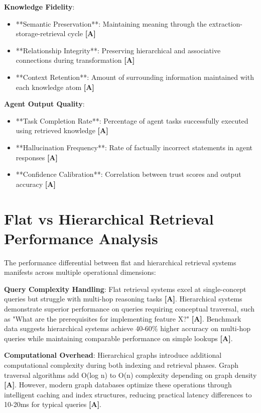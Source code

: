 \documentclass[a4paper,11pt]{article}
\newcommand{\alabel}{\textbf{\textcolor{acolor}{[A]}}}
\begin{document}
\textbf{Knowledge Fidelity}:

\begin{itemize}
  \item **Semantic Preservation**: Maintaining meaning through the extraction-storage-retrieval cycle \alabel{}
  \item **Relationship Integrity**: Preserving hierarchical and associative connections during transformation \alabel{}
  \item **Context Retention**: Amount of surrounding information maintained with each knowledge atom \alabel{}
\end{itemize}

\textbf{Agent Output Quality}:

\begin{itemize}
  \item **Task Completion Rate**: Percentage of agent tasks successfully executed using retrieved knowledge \alabel{}
  \item **Hallucination Frequency**: Rate of factually incorrect statements in agent responses \alabel{}
  \item **Confidence Calibration**: Correlation between trust scores and output accuracy \alabel{}
\end{itemize}

\section{Flat vs Hierarchical Retrieval Performance Analysis}

The performance differential between flat and hierarchical retrieval systems manifests across multiple operational dimensions:


\textbf{Query Complexity Handling}: Flat retrieval systems excel at single-concept queries but struggle with multi-hop reasoning tasks \alabel{}. Hierarchical systems demonstrate superior performance on queries requiring conceptual traversal, such as "What are the prerequisites for implementing feature X?" \alabel{}. Benchmark data suggests hierarchical systems achieve 40-60\% higher accuracy on multi-hop queries while maintaining comparable performance on simple lookups \alabel{}.


\textbf{Computational Overhead}: Hierarchical graphs introduce additional computational complexity during both indexing and retrieval phases. Graph traversal algorithms add O(log n) to O(n) complexity depending on graph density \alabel{}. However, modern graph databases optimize these operations through intelligent caching and index structures, reducing practical latency differences to 10-20ms for typical queries \alabel{}.
\end{document}
